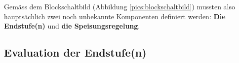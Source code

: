 Gemäss dem Blockschaltbild (Abbildung \ref{pics:blockschaltbild}) mussten also hauptsächlich zwei noch unbekannte Komponenten definiert werden: \textbf{Die Endstufe(n)} und \textbf{die Speisungsregelung}.
\subsection{Evaluation der Endstufe(n)}
